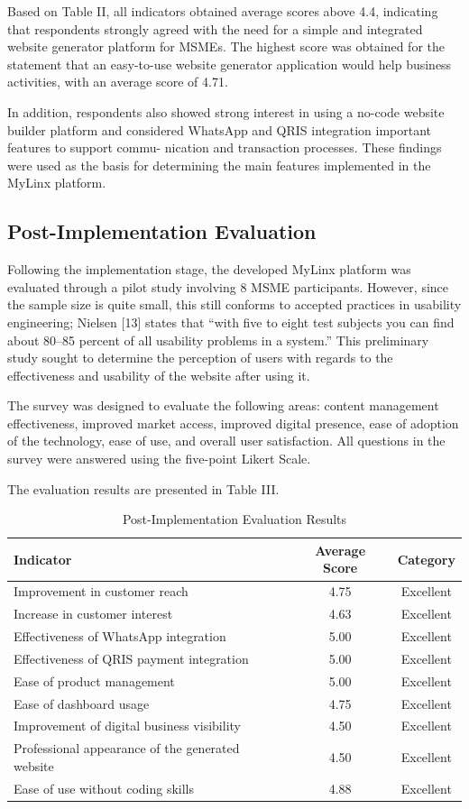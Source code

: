 \documentclass[conference]{IEEEtran}
\begin{document}
Based on Table II, all indicators obtained average scores above 4.4, indicating that respondents strongly agreed with the need for a simple and integrated website generator platform for MSMEs. The highest score was obtained for the statement that an easy-to-use website generator application would help business activities, with an average score of 4.71.

In addition, respondents also showed strong interest in using a no-code website builder platform and considered WhatsApp and QRIS integration important features to support commu- nication and transaction processes. These findings were used as the basis for determining the main features implemented in the MyLinx platform.

\subsection{Post-Implementation Evaluation}

Following the implementation stage, the developed MyLinx platform was evaluated through a pilot study involving 8 MSME participants. However, since the sample size is quite small, this still conforms to accepted practices in usability engineering; Nielsen [13] states that “with five to eight test subjects you can find about 80–85 percent of all usability problems in a system.” This preliminary study sought to determine the perception of users with regards to the effectiveness and usability of the website after using it. 

The survey was designed to evaluate the following areas: content management effectiveness, improved market access, improved digital presence, ease of adoption of the technology, ease of use, and overall user satisfaction. All questions in the survey were answered using the five-point Likert Scale.

The evaluation results are presented in Table III.

\begin{table}[H]
\centering
\small
\caption{Post-Implementation Evaluation Results}
\begin{tabular}{p{4.5cm}cc}
\hline
\textbf{Indicator} & \textbf{Average Score} & \textbf{Category} \\
\hline
Improvement in customer reach & 4.75 & Excellent \\
Increase in customer interest & 4.63 & Excellent \\
Effectiveness of WhatsApp integration & 5.00 & Excellent \\
Effectiveness of QRIS payment integration & 5.00 & Excellent \\
Ease of product management & 5.00 & Excellent \\
Ease of dashboard usage & 4.75 & Excellent \\
Improvement of digital business visibility & 4.50 & Excellent \\
Professional appearance of the generated website & 4.50 & Excellent \\
Ease of use without coding skills & 4.88 & Excellent \\
\hline
\end{tabular}
\label{tab:post_implementation}
\end{table}
\end{document}
